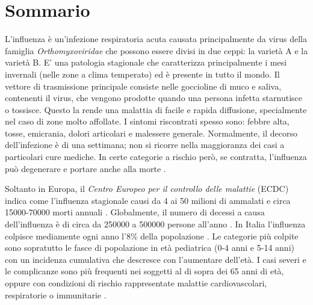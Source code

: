 \chapter*{Sommario} %
\label{sommario}


\bigskip
L'influenza è un'infezione respiratoria acuta causata principalmente da virus della famiglia \textit{Orthomyxoviridae} 
che possono essere divisi in due ceppi: la varietà A e la varietà B. E' una patologia stagionale
che caratterizza principalmente i mesi invernali (nelle zone a clima temperato) ed è presente in tutto il mondo.
Il vettore di trasmissione principale consiste nelle goccioline di muco e saliva, contenenti il virus, che vengono prodotte
quando una persona infetta starnutisce o tossisce. Questo la rende una malattia di facile e rapida diffusione, 
specialmente nel caso di zone molto affollate. I sintomi riscontrati spesso sono: febbre alta, tosse, emicrania, dolori 
articolari e malessere generale. Normalmente, il decorso dell'infezione è di una settimana; non si ricorre nella maggioranza 
dei casi a particolari cure mediche. In certe categorie a rischio però, se contratta, l'influenza può degenerare e portare 
anche alla morte \cite{whoinfluenza_keyfacts}. 
\bigskip

Soltanto in Europa, il \textit{Centro Europeo per il controllo delle malattie} (ECDC) indica come l'influenza
stagionale causi da 4 ai 50 milioni di ammalati e circa 15000-70000 morti annuali \cite{ecdc_keyfacts}.
Globalmente, il numero di decessi a causa dell'influenza è di circa da 250000 a 500000 persone all'anno
\cite{whoinfluenza_keyfacts}.  
In Italia l'influenza colpisce mediamente ogni anno l'8\% della popolazione \cite{epicentro}.
Le categorie più colpite sono sopratutto le fasce di popolazione in età pediatrica (0-4 anni e 5-14 anni)
con un incidenza cumulativa che descresce con l'aumentare dell'età. I casi severi e le complicanze
sono più frequenti nei soggetti al di sopra dei 65 anni di età, oppure con condizioni di rischio
rappresentate malattie cardiovascolari, respiratorie o immunitarie \cite{epicentro}.  
\bigskip

